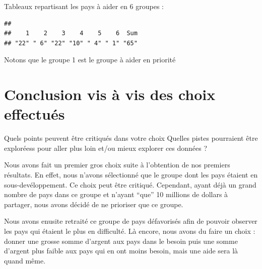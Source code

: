 \documentclass[
]{article}
\newenvironment{Shaded}{}{}
\newcommand{\AttributeTok}[1]{#1}
\newcommand{\CommentTok}[1]{\textcolor[rgb]{0.00,0.50,0.00}{#1}}
\newcommand{\ConstantTok}[1]{#1}
\newcommand{\DecValTok}[1]{#1}
\newcommand{\FunctionTok}[1]{#1}
\newcommand{\NormalTok}[1]{#1}
\newcommand{\OtherTok}[1]{\textcolor[rgb]{1.00,0.25,0.00}{#1}}
\newcommand{\SpecialCharTok}[1]{\textcolor[rgb]{0.00,0.50,0.50}{#1}}
\begin{document}
Tableaux repartisant les pays à aider en 6 groupes :

\begin{Shaded}
\end{Shaded}

\begin{verbatim}
## 
##    1    2    3    4    5    6  Sum 
## "22" " 6" "22" "10" " 4" " 1" "65"
\end{verbatim}

Notons que le groupe 1 est le groupe à aider en priorité

\hypertarget{conclusion-vis-uxe0-vis-des-choix-effectuuxe9s}{%
\section{Conclusion vis à vis des choix
effectués}\label{conclusion-vis-uxe0-vis-des-choix-effectuuxe9s}}

Quels points peuvent être critiqués dans votre choix Quelles pistes
pourraient être exploréess pour aller plus loin et/ou mieux explorer ces
données ?

Nous avons fait un premier gros choix suite à l'obtention de nos
premiers résultats. En effet, nous n'avons sélectionné que le groupe
dont les pays étaient en sous-devéloppement. Ce choix peut être
critiqué. Cependant, ayant déjà un grand nombre de pays dans ce groupe
et n'ayant ``que'' 10 millions de dollars à partager, nous avons décidé
de ne prioriser que ce groupe.

Nous avons enusite retraité ce groupe de pays défavorisés afin de
pouvoir observer les pays qui étaient le plus en difficulté. Là encore,
nous avons du faire un choix : donner une grosse somme d'argent aux pays
dans le besoin puis une somme d'argent plus faible aux pays qui en ont
moins besoin, mais une aide sera là quand même.
\end{document}
